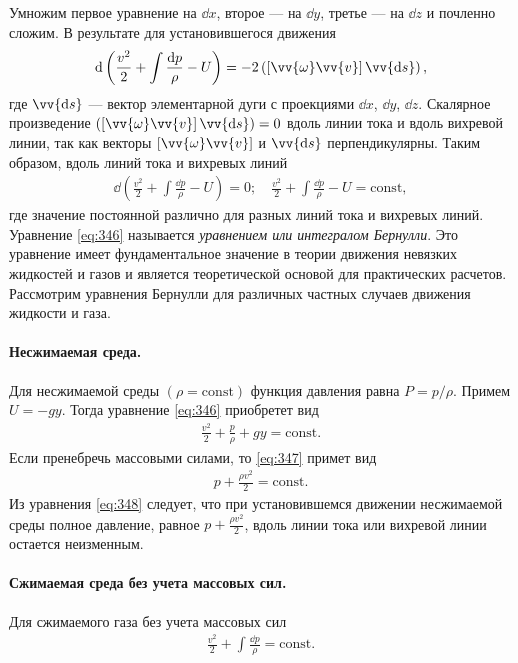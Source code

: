 	Умножим первое уравнение на $\dd x$, второе --- на $\dd y$, третье --- на $\dd z$ и почленно сложим. В результате для установившегося движения
	\begin{gather*}
		\dd\left(\frac{v^2}{2} + \int\frac{\dd p}{\rho} - U\right) = -2\left(\left[\vv{\omega}\vv{v}\right]\vv{\dd s}\right),
	\end{gather*}
	где $\vv{\dd s}$ --- вектор элементарной дуги с проекциями $\dd x$, $\dd y$, $\dd z$.\n
	Скалярное произведение $\left(\left[\vv{\omega}\vv{v}\right]\vv{\dd s}\right) = 0$ вдоль линии тока и вдоль вихревой линии, так как векторы $\left[\vv{\omega}\vv{v}\right]$ и $\vv{\dd s}$ перпендикулярны. Таким образом, вдоль линий тока и вихревых линий
	\begin{gather}\label{eq:346}
		\dd\left(\frac{v^2}{2} + \int\frac{\dd p}{\rho} - U\right) = 0;\quad
		\frac{v^2}{2} + \int\frac{\dd p}{\rho} - U = \mathrm{const},
	\end{gather}
	где значение постоянной различно для разных линий тока и вихревых линий.\n
	Уравнение \eqref{eq:346} называется \textit{уравнением или интегралом Бернулли}. Это уравнение имеет фундаментальное значение в теории движения невязких жидкостей и газов и является теоретической основой для практических расчетов.\n
	Рассмотрим уравнения Бернулли для различных частных случаев движения жидкости и газа.
	\paragraph{Несжимаемая среда.} Для несжимаемой среды $\left(\rho = \mathrm{const}\right)$ функция давления равна $P = p/\rho$. Примем $U = -gy$. Тогда уравнение \eqref{eq:346} приобретет вид
	\begin{gather}\label{eq:347}
		\frac{v^2}{2} + \frac{p}{\rho} + gy = \mathrm{const}.
	\end{gather}\n
	Если пренебречь массовыми силами, то \eqref{eq:347} примет вид
	\begin{gather}\label{eq:348}
		p + \frac{\rho v^2}{2} = \mathrm{const}.
	\end{gather}\n
	Из уравнения \eqref{eq:348} следует, что при установившемся движении несжимаемой среды полное давление, равное $p + \frac{\rho v^2}{2}$, вдоль линии тока или вихревой линии остается неизменным.
	\paragraph{Сжимаемая среда без учета массовых сил.} Для сжимаемого газа без учета массовых сил
	\begin{gather}\label{eq:349}
		\frac{v^2}{2} + \int\frac{\dd p}{\rho} = \mathrm{const}.
	\end{gather}
